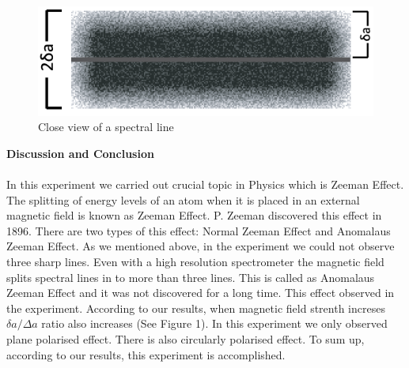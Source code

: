 \documentclass[a4paper,12pt]{article}
\begin{document}
\begin{figure}[h!]
 	\centering
 	\includegraphics[scale = 1.0]{b3}
 	\caption{Close view of a spectral line}
 	\label{fig:b3}
 \end{figure}
 
\textbf{Discussion and Conclusion}\\\\
In this experiment we carried out crucial topic in Physics which is Zeeman Effect. The splitting of energy levels of an atom when it is placed in an external magnetic field is known as Zeeman Effect. P. Zeeman discovered this effect in 1896. There are two types of this effect: Normal Zeeman Effect and Anomalaus Zeeman Effect. As we mentioned above, in the experiment we could not observe three sharp lines. Even with a high resolution spectrometer the magnetic field splits spectral lines in to more than three lines. This is called as Anomalaus Zeeman Effect and it was not discovered for a long time. This effect observed in the experiment. According to our results, when magnetic field strenth increses $\delta a /\Delta a$ ratio also increases (See Figure 1). In this experiment we only observed plane polarised effect. There is also circularly polarised effect. To sum up, according to our results, this experiment is accomplished. 
\end{document}
